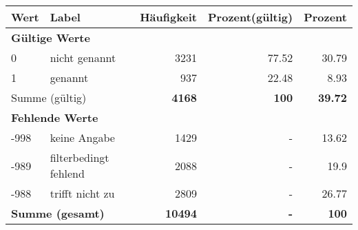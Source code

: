      \begin{longtable}{lXrrr}
     \toprule
     \textbf{Wert} & \textbf{Label} & \textbf{Häufigkeit} & \textbf{Prozent(gültig)} & \textbf{Prozent} \\
     \endhead
     \midrule
     \multicolumn{5}{l}{\textbf{Gültige Werte}}\\

     0 &
     \multicolumn{1}{X}{ nicht genannt   } &


       \num{3231} &
       \num[round-mode=places,round-precision=2]{77,52} &
         \num[round-mode=places,round-precision=2]{30,79} \\

     1 &
     \multicolumn{1}{X}{ genannt   } &


       \num{937} &
       \num[round-mode=places,round-precision=2]{22,48} &
         \num[round-mode=places,round-precision=2]{8,93} \\
     \midrule
     \multicolumn{2}{l}{Summe (gültig)} &
       \textbf{\num{4168}} &
     \textbf{100} &
       \textbf{\num[round-mode=places,round-precision=2]{39,72}} \\
     \multicolumn{5}{l}{\textbf{Fehlende Werte}}\\
       -998 &
       keine Angabe &
         \num{1429} &
        - &
         \num[round-mode=places,round-precision=2]{13,62} \\
       -989 &
       filterbedingt fehlend &
         \num{2088} &
        - &
         \num[round-mode=places,round-precision=2]{19,9} \\
       -988 &
       trifft nicht zu &
         \num{2809} &
        - &
         \num[round-mode=places,round-precision=2]{26,77} \\
     \midrule
     \multicolumn{2}{l}{\textbf{Summe (gesamt)}} &
          \textbf{\num{10494}} &
        \textbf{-} &
        \textbf{100} \\
     \bottomrule
     \end{longtable}
     
